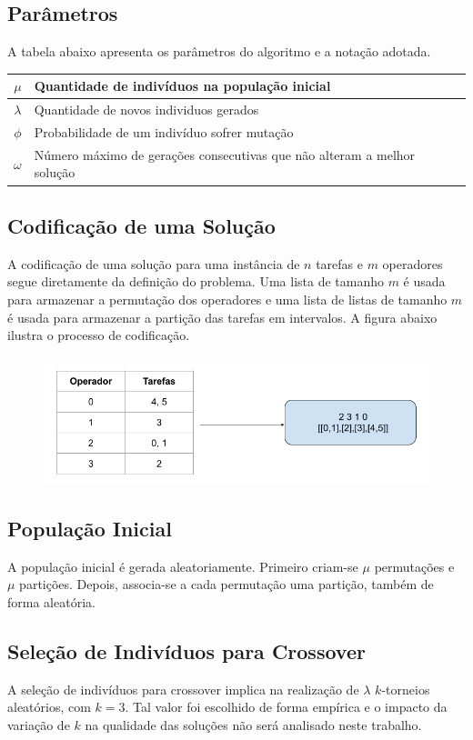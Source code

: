 \documentclass{article}
\begin{document}
\subsection{Parâmetros}
A tabela abaixo apresenta os parâmetros do algoritmo e a notação adotada.
\begin{table}[ht]
\centering
\begin{tabular}{c|l}
\hline
$\mu$ & Quantidade de indivíduos na população inicial \\ \hline
$\lambda$ & Quantidade de novos individuos gerados \\ \hline
$\phi$ & Probabilidade de um indivíduo sofrer mutação \\ \hline
$\omega$ & Número máximo de gerações consecutivas que não alteram a melhor solução \\ \hline
\end{tabular}
\end{table}\subsection{Codificação de uma Solução}
A codificação de uma solução para uma instância de $n$ tarefas e $m$ operadores segue diretamente da definição do problema. Uma lista de tamanho $m$ é usada para armazenar a permutação dos operadores e uma lista de listas de tamanho $m$ é usada para armazenar a partição das tarefas em intervalos. A figura abaixo ilustra o processo de codificação.
\begin{figure}[tph!]
\centering
\includegraphics[scale=0.35]{figure1}
\end{figure}


\newpage
\subsection{População Inicial}
A população inicial é gerada aleatoriamente. Primeiro criam-se $\mu$ permutações e $\mu$ partições. Depois, associa-se a cada permutação uma partição, também de forma aleatória. 

\subsection{Seleção de Indivíduos para Crossover}
A seleção de indivíduos para crossover implica na realização de $\lambda$ $k$-torneios aleatórios, com $k=3$. Tal valor foi escolhido de forma empírica e o impacto da variação de $k$ na qualidade das soluções não será analisado neste trabalho.
 
\end{document}
